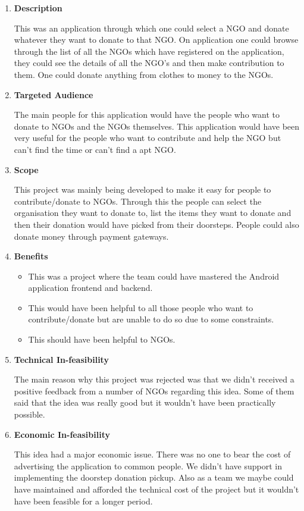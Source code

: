 \documentclass[fleqn,10pt]{../SelfArx} %
\begin{document}
\vspace{0.5cm}
\begin{enumerate}
\item \textbf{Description}

This was an application through which one could select a NGO and donate whatever they want to donate to that NGO. On application one could browse through the list of all the NGOs which have registered on the application, they could see the details of all the NGO's and then make contribution to them. One could donate anything from clothes to money to the NGOs.

\item \textbf{Targeted Audience}

The main people for this application would have the people who want to donate to NGOs and the NGOs themselves. This application would have been very useful for the people who want to contribute and help the NGO but can't find the time or can't find a apt NGO.

\item \textbf{Scope}

This project was mainly being developed to make it easy for people to contribute/donate to NGOs. Through this the people can select the organisation they want to donate to, list the items they want to donate and then their donation would have picked from their doorsteps. People could also donate money through payment gateways.

\item \textbf{Benefits}

\begin{itemize}
    \item	This was a project where the team could have mastered the Android application frontend and backend.
  \item		This would have been helpful to all those people who want to contribute/donate but are unable to do so due to some constraints.
  \item		This should have been helpful to NGOs.
\end{itemize}

\item \textbf{Technical  In-feasibility}

The main reason why this project was rejected was that we didn't received a positive feedback from a number of NGOs regarding this idea. Some of them said that the idea was really good but it wouldn't have been practically possible.

\item \textbf{Economic  In-feasibility}

This idea had a major economic issue. There was no one to bear the cost of advertising the application to common people. We didn't have support in implementing the doorstep donation pickup. Also as a team we maybe could have maintained and afforded the technical cost of the project but it wouldn't have been feasible for a longer period. 
\end{enumerate}
\end{document}
